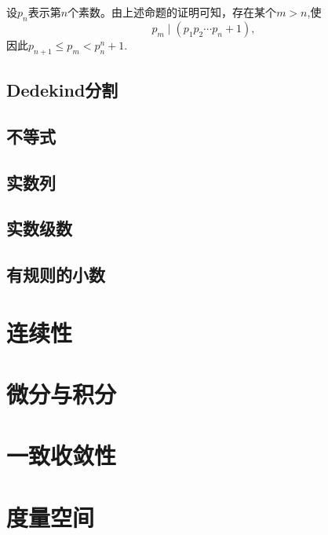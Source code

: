 \begin{remark}
设$p_n$表示第$n$个素数。由上述命题的证明可知，存在某个$m > n$,使
\[
p_m \mid (p_1p_2\cdots p_n + 1),
\]
因此$p_{n+1} \le p_m < p_n^n + 1$.
\end{remark}

\section{Dedekind分割}\label{sec0100102}


\section{不等式}\label{sec0100103}

\section{实数列}\label{sec0100104}

\section{实数级数}\label{sec0100105}

\section{有规则的小数}\label{sec0100106}


\chapter{连续性}\label{ch01002}


\chapter{微分与积分}\label{ch01003}

\chapter{一致收敛性}\label{ch01004}

\chapter{度量空间}\label{ch01005}












